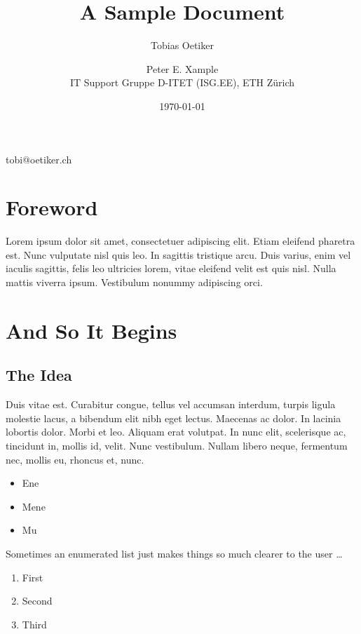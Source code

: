 \documentclass[a4paper,12pt]{book}
\title{A Sample Document}
\date{\today}
\author{Tobias Oetiker\and Peter E. Xample\\
IT Support Gruppe D-ITET (ISG.EE), ETH Z\"urich}
\begin{document}
\maketitle

tobi@oetiker.ch

\frontmatter %

\chapter*{Foreword}
Lorem ipsum dolor sit amet, consectetuer
adipiscing elit. Etiam eleifend pharetra est. Nunc vulputate nisl quis
leo. In sagittis tristique arcu. Duis varius, enim vel iaculis
sagittis, felis leo ultricies lorem, vitae eleifend velit est quis
nisl. Nulla mattis viverra ipsum. Vestibulum nonummy
adipiscing orci.

\tableofcontents
\listoftables
\listoffigures

\mainmatter

\chapter{And So It Begins}


\section{The Idea}
Duis vitae est. Curabitur congue, tellus vel accumsan interdum, turpis
ligula molestie lacus, a bibendum elit nibh eget lectus. Maecenas ac
dolor. In lacinia lobortis dolor. Morbi et leo. Aliquam erat
volutpat. In nunc elit, scelerisque ac, tincidunt in, mollis id,
velit. Nunc vestibulum. Nullam libero neque, fermentum nec, mollis eu,
rhoncus et, nunc. 

\begin{itemize}
  \item Ene
  \item Mene
  \item Mu
\end{itemize}

Sometimes an enumerated list just makes things so much clearer to the user \ldots
\begin{enumerate}
  \item First
  \item Second
  \item Third
\end{enumerate}
\end{document}
